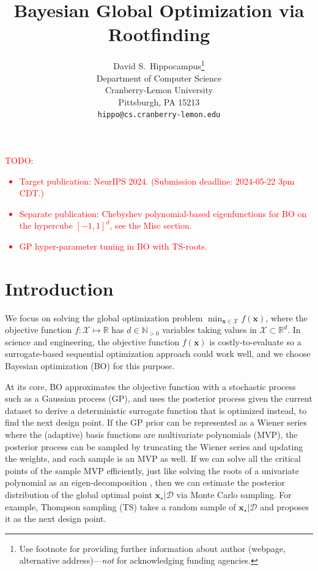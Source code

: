 \documentclass{article}
\title{Bayesian Global Optimization via Rootfinding}
\author{%
  David S.~Hippocampus\thanks{Use footnote for providing further information
    about author (webpage, alternative address)---\emph{not} for acknowledging
    funding agencies.} \\
  Department of Computer Science\\
  Cranberry-Lemon University\\
  Pittsburgh, PA 15213 \\
  \texttt{hippo@cs.cranberry-lemon.edu} \\
}
\begin{document}
\maketitle


\begin{abstract}
\end{abstract}

\textcolor{red}{TODO:
\begin{itemize}
\item
  Target publication: NeurIPS 2024. (Submission deadline: 2024-05-22 3pm
  CDT.)
\item
  Separate publication: Chebyshev polynomial-based eigenfunctions for BO
  on the hypercube $[-1, 1]^d$, see the Misc section.
\item
  GP hyper-parameter tuning in BO with TS-roots.
\end{itemize}
}

\section{Introduction}

We focus on solving the global optimization
problem $\min_{\mathbf{x} \in \mathcal{X}} f(\mathbf{x})$, where the
objective function $f: \mathcal{X} \mapsto \mathbb{R}$ has
$d \in \mathbb{N}_{>0}$ variables taking values in
$\mathcal{X} \subset \mathbb{R}^d$.
In science and engineering, the objective function
$f(\mathbf{x})$ is costly-to-evaluate so a surrogate-based sequential
optimization approach could work well, and we choose Bayesian
optimization (BO) \cite{Garnett2023} for this purpose.

At its core, BO approximates the objective function with a stochastic
process such as a Gaussian process (GP), and uses the posterior process
given the current dataset to derive a deterministic surrogate function
that is optimized instead, to find the next design point. If the GP
prior can be represented as a Wiener series where the (adaptive) basis
functions are multivariate polynomials (MVP), the posterior process can
be sampled by truncating the Wiener series and updating the weights, and
each sample is an MVP as well. If we can solve all the critical points of
the sample MVP efficiently, just like solving the roots of a univariate
polynomial as an eigen-decomposition \cite{Trefethen2019}, then we can
estimate the posterior distribution of the global optimal point
$\mathbf{x}_\star|\mathcal{D}$ via Monte Carlo sampling. For example,
Thompson sampling (TS) takes a random sample of
$\mathbf{x}_\star|\mathcal{D}$ and proposes it as the next design
point.
\end{document}
